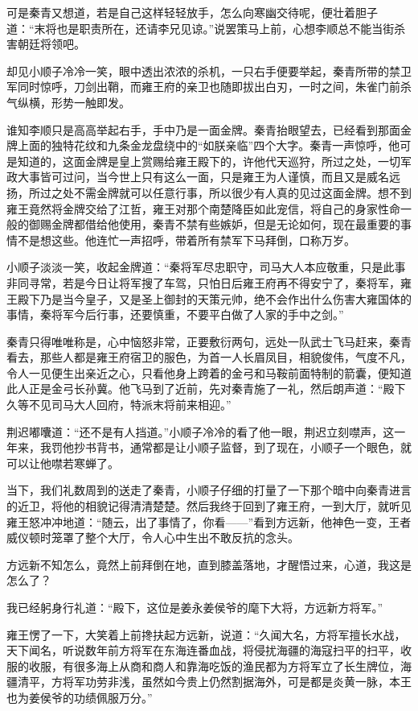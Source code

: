 可是秦青又想道，若是自己这样轻轻放手，怎么向寒幽交待呢，便壮着胆子道：“末将也是职责所在，还请李兄见谅。”说罢策马上前，心想李顺总不能当街杀害朝廷将领吧。

却见小顺子冷冷一笑，眼中透出浓浓的杀机，一只右手便要举起，秦青所带的禁卫军同时惊呼，刀剑出鞘，而雍王府的亲卫也随即拔出白刃，一时之间，朱雀门前杀气纵横，形势一触即发。

谁知李顺只是高高举起右手，手中乃是一面金牌。秦青抬眼望去，已经看到那面金牌上面的独特花纹和九条金龙盘绕中的“如朕亲临”四个大字。秦青一声惊呼，他可是知道的，这面金牌是皇上赏赐给雍王殿下的，许他代天巡狩，所过之处，一切军政大事皆可过问，当今世上只有这么一面，只是雍王为人谨慎，而且又是威名远扬，所过之处不需金牌就可以任意行事，所以很少有人真的见过这面金牌。想不到雍王竟然将金牌交给了江哲，雍王对那个南楚降臣如此宠信，将自己的身家性命一般的御赐金牌都借给他使用，秦青不禁有些嫉妒，但是无论如何，现在最重要的事情不是想这些。他连忙一声招呼，带着所有禁军下马拜倒，口称万岁。

小顺子淡淡一笑，收起金牌道：“秦将军尽忠职守，司马大人本应敬重，只是此事非同寻常，若是今日让将军搜了车驾，只怕日后雍王府再不得安宁了，秦将军，雍王殿下乃是当今皇子，又是圣上御封的天策元帅，绝不会作出什么伤害大雍国体的事情，秦将军今后行事，还要慎重，不要平白做了人家的手中之剑。”

秦青只得唯唯称是，心中恼怒非常，正要敷衍两句，远处一队武士飞马赶来，秦青看去，那些人都是雍王府宿卫的服色，为首一人长眉凤目，相貌俊伟，气度不凡，令人一见便生出亲近之心，只看他身上跨着的金弓和马鞍前面特制的箭囊，便知道此人正是金弓长孙冀。他飞马到了近前，先对秦青施了一礼，然后朗声道：“殿下久等不见司马大人回府，特派末将前来相迎。”

荆迟嘟囔道：“还不是有人挡道。”小顺子冷冷的看了他一眼，荆迟立刻噤声，这一年来，我罚他抄书背书，通常都是让小顺子监督，到了现在，小顺子一个眼色，就可以让他噤若寒蝉了。

当下，我们礼数周到的送走了秦青，小顺子仔细的打量了一下那个暗中向秦青进言的近卫，将他的相貌记得清清楚楚。然后我终于回到了雍王府，一到大厅，就听见雍王怒冲冲地道：“随云，出了事情了，你看——”看到方远新，他神色一变，王者威仪顿时笼罩了整个大厅，令人心中生出不敢反抗的念头。

方远新不知怎么，竟然上前拜倒在地，直到膝盖落地，才醒悟过来，心道，我这是怎么了？

我已经躬身行礼道：“殿下，这位是姜永姜侯爷的麾下大将，方远新方将军。”

雍王愣了一下，大笑着上前搀扶起方远新，说道：“久闻大名，方将军擅长水战，天下闻名，听说数年前方将军在东海连番血战，将侵扰海疆的海寇扫平的扫平，收服的收服，有很多海上从商和商人和靠海吃饭的渔民都为方将军立了长生牌位，海疆清平，方将军功劳非浅，虽然如今贵上仍然割据海外，可是都是炎黄一脉，本王也为姜侯爷的功绩佩服万分。”

